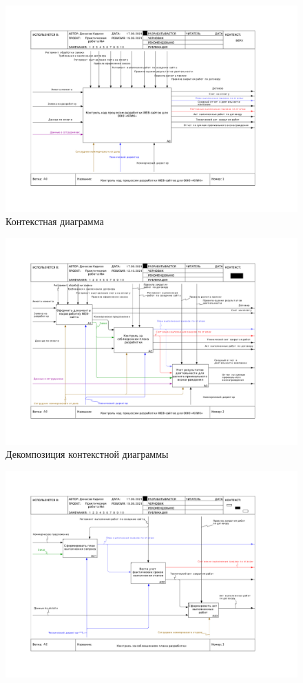 \documentclass[a4paper,14pt]{extarticle}
\begin{document}
\begin{center}

\begin{figure}[htbp]
	\centering
	\includegraphics[width=0.9\linewidth]{images/ramusPr6-1}
	\caption{Контекстная диаграмма}
	\label{fig:ramuspr6-1}
\end{figure}
\begin{figure}[htbp]
	\centering
	\includegraphics[width=0.9\linewidth]{images/ramusPr6-2}
	\caption{Декомпозиция контекстной диаграммы}
	\label{fig:ramuspr6-2}
\end{figure}
\begin{figure}[htbp]
	\centering
	\includegraphics[width=0.9\linewidth]{images/ramusPr6-3}

\end{figure}
\end{center}
\end{document}

